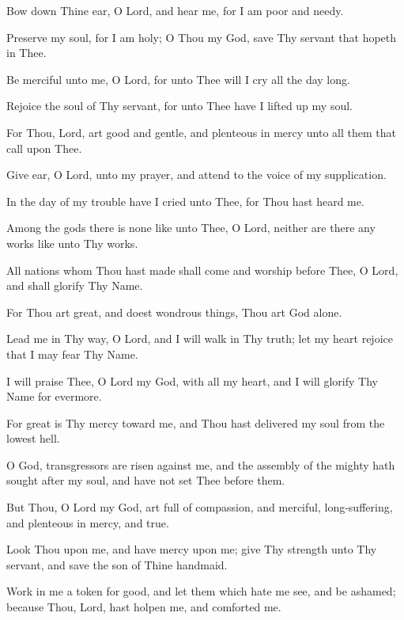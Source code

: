 Bow down Thine ear, O Lord, and hear me, for I am poor and needy.

Preserve my soul, for I am holy; O Thou my God, save Thy servant that hopeth in Thee.

Be merciful unto me, O Lord, for unto Thee will I cry all the day long.

Rejoice the soul of Thy servant, for unto Thee have I lifted up my soul.

For Thou, Lord, art good and gentle, and plenteous in mercy unto all them that call upon Thee.

Give ear, O Lord, unto my prayer, and attend to the voice of my supplication.

In the day of my trouble have I cried unto Thee, for Thou hast heard me.

Among the gods there is none like unto Thee, O Lord, neither are there any works like unto Thy works.

All nations whom Thou hast made shall come and worship before Thee, O Lord, and shall glorify Thy Name.

For Thou art great, and doest wondrous things, Thou art God alone.

Lead me in Thy way, O Lord, and I will walk in Thy truth; let my heart rejoice that I may fear Thy Name.

I will praise Thee, O Lord my God, with all my heart, and I will glorify Thy Name for evermore.

For great is Thy mercy toward me, and Thou hast delivered my soul from the lowest hell.

O God, transgressors are risen against me, and the assembly of the mighty hath sought after my soul, and have not set Thee before them.

But Thou, O Lord my God, art full of compassion, and merciful, long-suffering, and plenteous in mercy, and true.

Look Thou upon me, and have mercy upon me; give Thy strength unto Thy servant, and save the son of Thine handmaid.

Work in me a token for good, and let them which hate me see, and be ashamed; because Thou, Lord, hast holpen me, and comforted me.
